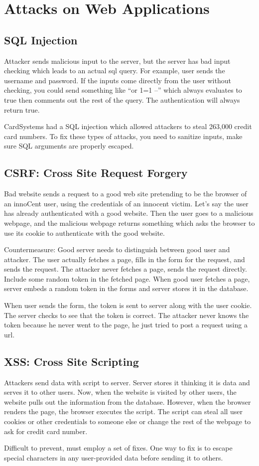 \documentclass[psamsfonts]{amsart}
\begin{document}
\section{Attacks on Web Applications}

\subsection{SQL Injection}

Attacker sends malicious input to the server, but the server has bad input checking which leads to an actual sql query. For example, user sends the username and password. If the inputs come directly from the user without checking, you could send something like ``or 1=1 --'' which always evaluates to true then comments out the rest of the query. The authentication will always return true.

CardSystems had a SQL injection which allowed attackers to steal 263,000 credit card numbers. To fix these types of attacks, you need to sanitize inputs, make sure SQL arguments are properly escaped.

\subsection{CSRF: Cross Site Request Forgery}

Bad website sends a request to a good web site pretending to be the browser of an innoCent user, using the credentials of an innocent victim. Let's say the user has already authenticated with a good website. Then the user goes to a malicious webpage, and the malicious webpage returns something which asks the browser to use its cookie to authenticate with the good website.

Countermeasure: Good server needs to distinguish between good user and attacker. The user actually fetches a page, fills in the form for the request, and sends the request. The attacker never fetches a page, sends the request directly. Include some random token in the fetched page. When good user fetches a page, server embeds a random token in the forms and server stores it in the database.

When user sends the form, the token is sent to server along with the user cookie. The server checks to see that the token is correct. The attacker never knows the token because he never went to the page, he just tried to post a request using a url.

\subsection{XSS: Cross Site Scripting}

Attackers send data with script to server. Server stores it thinking it is data and serves it to other users. Now, when the website is visited by other users, the website pulls out the information from the database. However, when the browser renders the page, the browser executes the script. The script can steal all user cookies or other credentials to someone else or change the rest of the webpage to ask for credit card number.

Difficult to prevent, must employ a set of fixes. One way to fix is to escape special characters in any user-provided data before sending it to others.
\end{document}
